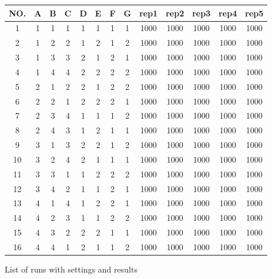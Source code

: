 \begin{figure}[H]
	\centering
	\begin{tabular}{ |c||c|c|c|c|c|c|c||c|c|c|c|c|  }
		\hline
		NO.& A & B & C & D & E & F & G & rep1 & rep2 & rep3 & rep4 & rep5\\
		\hline
		1  & 1 & 1 & 1 & 1 & 1 & 1 & 1 & 1000 & 1000 & 1000 & 1000 & 1000\\
		2  & 1 & 2 & 2 & 1 & 2 & 1 & 2 & 1000 & 1000 & 1000 & 1000 & 1000\\
		3  & 1 & 3 & 3 & 2 & 1 & 2 & 1 & 1000 & 1000 & 1000 & 1000 & 1000\\
		4  & 1 & 4 & 4 & 2 & 2 & 2 & 2 & 1000 & 1000 & 1000 & 1000 & 1000\\
		5  & 2 & 1 & 2 & 2 & 1 & 2 & 2 & 1000 & 1000 & 1000 & 1000 & 1000\\
		6  & 2 & 2 & 1 & 2 & 2 & 2 & 1 & 1000 & 1000 & 1000 & 1000 & 1000\\
		7  & 2 & 3 & 4 & 1 & 1 & 1 & 2 & 1000 & 1000 & 1000 & 1000 & 1000\\
		8  & 2 & 4 & 3 & 1 & 2 & 1 & 1 & 1000 & 1000 & 1000 & 1000 & 1000\\
		9  & 3 & 1 & 3 & 2 & 2 & 1 & 2 & 1000 & 1000 & 1000 & 1000 & 1000\\
		10 & 3 & 2 & 4 & 2 & 1 & 1 & 1 & 1000 & 1000 & 1000 & 1000 & 1000\\
		11 & 3 & 3 & 1 & 1 & 2 & 2 & 2 & 1000 & 1000 & 1000 & 1000 & 1000\\
		12 & 3 & 4 & 2 & 1 & 1 & 2 & 1 & 1000 & 1000 & 1000 & 1000 & 1000\\
		13 & 4 & 1 & 4 & 1 & 2 & 2 & 1 & 1000 & 1000 & 1000 & 1000 & 1000\\
		14 & 4 & 2 & 3 & 1 & 1 & 2 & 2 & 1000 & 1000 & 1000 & 1000 & 1000\\
		15 & 4 & 3 & 2 & 2 & 2 & 1 & 1 & 1000 & 1000 & 1000 & 1000 & 1000\\
		16 & 4 & 4 & 1 & 2 & 1 & 1 & 2 & 1000 & 1000 & 1000 & 1000 & 1000\\
		\hline
	\end{tabular}
	\caption{List of runs with settings and results}
\end{figure}




